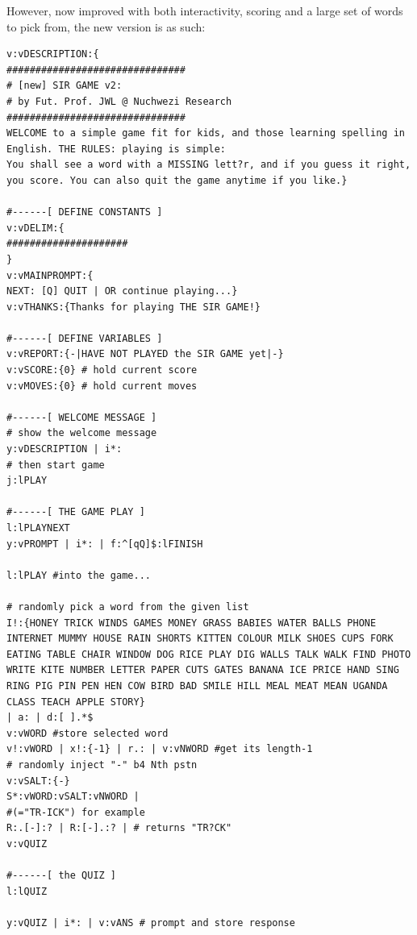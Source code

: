 \documentclass[a4paper, 18pt]{book} %
\begin{document}
{{{\vspace{1em}
  
  However, now improved with both interactivity, scoring and a large set of words to pick from, the new version is as such:
  
  
  
  \vspace{2em}


{
 \Large
  \begin{tcolorbox}[teaterminalstyle, title=TEA Program:  SIR GAME v2, breakable]
  \begin{lstlisting}[language=TEA,breaklines=true,]
v:vDESCRIPTION:{
###############################
# [new] SIR GAME v2: 
# by Fut. Prof. JWL @ Nuchwezi Research
###############################
WELCOME to a simple game fit for kids, and those learning spelling in English. THE RULES: playing is simple: 
You shall see a word with a MISSING lett?r, and if you guess it right, you score. You can also quit the game anytime if you like.}

#------[ DEFINE CONSTANTS ]
v:vDELIM:{
#####################
}
v:vMAINPROMPT:{
NEXT: [Q] QUIT | OR continue playing...}
v:vTHANKS:{Thanks for playing THE SIR GAME!}

#------[ DEFINE VARIABLES ]
v:vREPORT:{-|HAVE NOT PLAYED the SIR GAME yet|-}
v:vSCORE:{0} # hold current score
v:vMOVES:{0} # hold current moves

#------[ WELCOME MESSAGE ]
# show the welcome message
y:vDESCRIPTION | i*:
# then start game
j:lPLAY

#------[ THE GAME PLAY ]
l:lPLAYNEXT
y:vPROMPT | i*: | f:^[qQ]$:lFINISH

l:lPLAY #into the game...

# randomly pick a word from the given list
I!:{HONEY TRICK WINDS GAMES MONEY GRASS BABIES WATER BALLS PHONE INTERNET MUMMY HOUSE RAIN SHORTS KITTEN COLOUR MILK SHOES CUPS FORK EATING TABLE CHAIR WINDOW DOG RICE PLAY DIG WALLS TALK WALK FIND PHOTO WRITE KITE NUMBER LETTER PAPER CUTS GATES BANANA ICE PRICE HAND SING RING PIG PIN PEN HEN COW BIRD BAD SMILE HILL MEAL MEAT MEAN UGANDA CLASS TEACH APPLE STORY} 
| a: | d:[ ].*$ 
v:vWORD #store selected word
v!:vWORD | x!:{-1} | r.: | v:vNWORD #get its length-1
# randomly inject "-" b4 Nth pstn 
v:vSALT:{-}
S*:vWORD:vSALT:vNWORD | 
#(="TR-ICK") for example
R:.[-]:? | R:[-].:? | # returns "TR?CK"
v:vQUIZ

#------[ the QUIZ ]
l:lQUIZ 

y:vQUIZ | i*: | v:vANS # prompt and store response


\end{lstlisting}
\end{tcolorbox}}}}}
\end{document}
